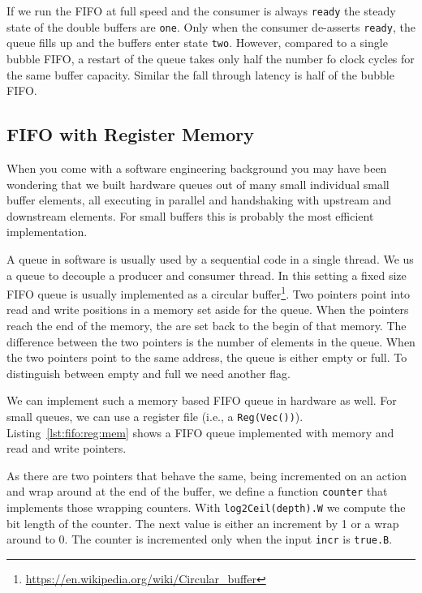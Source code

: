 \documentclass[%
    10pt,
    headinclude, footexclude,
    openright, %
    notitlepage,
    cleardoubleempty,
    headsepline,
    pointlessnumbers,
    bibtotoc, idxtotoc,
    ]{scrbook}
\newcommand{\code}[1]{{\small{\texttt{#1}}}}
\newcommand{\myref}[2]{\href{#1}{#2}}
\renewcommand{\myref}[2]{{#2}{\footnote{\url{#1}}}}
\begin{document}
If we run the FIFO at full speed and the consumer is always \code{ready}
the steady state of the double buffers are \code{one}. Only when the consumer
de-asserts \code{ready}, the queue fills up and the buffers enter state \code{two}.
However, compared to a single bubble FIFO, a restart of the queue takes
only half the number fo clock cycles for the same buffer capacity.
Similar the fall through latency is half of the bubble FIFO.

\subsection{FIFO with Register Memory}

When you come with a software engineering background you may have been
wondering that we built hardware queues out of many small individual small buffer
elements, all executing in parallel and handshaking with upstream and downstream
elements. For small buffers this is probably the most efficient implementation.

A queue in software is usually used by a sequential code in a single thread.
We us a queue to decouple a producer and consumer thread.
In this setting a fixed size FIFO queue is usually implemented as a
\myref{https://en.wikipedia.org/wiki/Circular_buffer}{circular buffer}.
Two pointers point into read and write positions in a memory set aside
for the queue. When the pointers reach the end of the memory, the
are set back to the begin of that memory. The difference between the two
pointers is the number of elements in the queue. When the two pointers
point to the same address, the queue is either empty or full.
To distinguish between empty and full we need another flag.

We can implement such a memory based FIFO queue in hardware as
well. For small queues, we can use a register file (i.e., a \code{Reg(Vec())}).
Listing~\ref{lst:fifo:reg:mem} shows a FIFO queue implemented with  memory
and read and write pointers.


As there are two pointers that behave the same, being incremented on an
action and wrap around at the end of the buffer, we define a function \code{counter}
that implements those wrapping counters. With \code{log2Ceil(depth).W} we
compute the bit length of the counter. The next value is either an increment by
1 or a wrap around to 0.
The counter is incremented only when the input \code{incr} is \code{true.B}.
\end{document}
